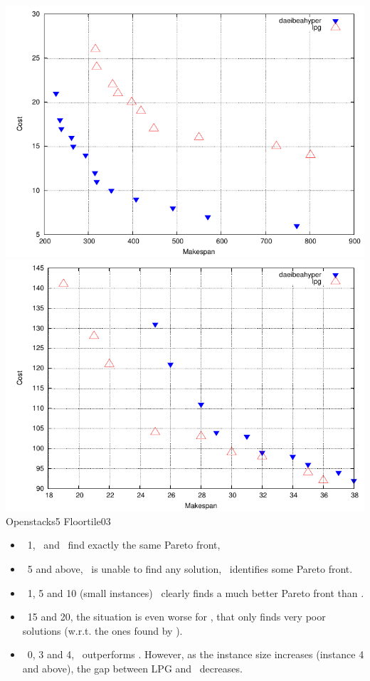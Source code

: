 \documentclass[portrait,a0paper,fontscale=0.277]{baposter}
\newcommand{\compresslist}{%
\setlength{\itemsep}{1pt}%
\setlength{\parskip}{0pt}%
\setlength{\parsep}{0pt}%
}
\begin{document}
\begin{poster}
{\begin{center}
\includegraphics[scale=0.5]{p05_openstacks_Add_dae_pareto}  \hspace{1cm} \includegraphics[scale=0.5]{pfile3_floortile_Add_dae_pareto}\\
\hspace{-3.cm} Openstacks5 \hspace{5.3cm} Floortile03 
\end{center}

\begin{itemize}\compresslist
\item \ELEVATORS\ 1, \MODAEYAHSP\ and \MOLPG\ find exactly the same Pareto front,
\item \ELEVATORS\ 5 and above, \MOLPG\ is unable to find any solution, \MODAEYAHSP\ identifies some Pareto front.
\item \OPENSTACKS\ 1, 5 and 10 (small instances) \MODAEYAHSP\ clearly finds a much better Pareto front than \MOLPG.
\item \OPENSTACKS\ 15 and 20, the situation is even worse for \MOLPG, that only finds very poor solutions (w.r.t. the ones found by \MODAEYAHSP).
\item \FLOORTILE\ 0, 3 and 4, \MOLPG\ outperforms \MODAEYAHSP. However, as the instance size increases (instance 4 and above), the gap between LPG and \DAE\ decreases.
\end{itemize}

}
\end{poster}
\end{document}
